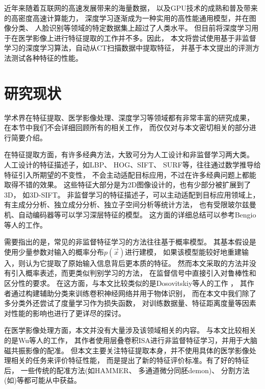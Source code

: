 近年来随着互联网的高速发展带来的海量数据，
以及GPU技术的成熟和普及带来的高密度高速计算能力，
深度学习逐渐成为一种实用的高性能通用模型，并在图像分类\cite{he2015delving}、
人脸识别\cite{schroff2015facenet}等领域的特定数据集上超过了人类水平。
但目前将深度学习用于在医学影像上进行特征提取的工作并不多。因此，
本文将尝试使用基于非监督学习的深度学习算法，自动从CT扫描数据中提取特征，
并基于本文提出的评测方法测试各种特征的性能。

\section{研究现状}
学术界在特征提取、医学影像处理、深度学习等领域都有非常丰富的研究成果，
在本节中我们不会详细回顾所有的相关工作，
而仅仅对与本文密切相关的部分进行简要介绍。

在特征提取方面，有许多经典方法，大致可分为人工设计和非监督学习两大类。
人工设计的特征描述子，如LBP\cite{ojala1994performance}、
HOG\cite{dalal2005histograms}、SIFT\cite{lowe1999object}、
SURF\cite{bay2006surf}等，往往通过数学推导给特征引入所期望的不变性，
不会主动适配目标应用，不过在许多经典问题上都能取得不错的效果。
这些特征大部分是为2D图像设计的，也有少部分被扩展到了3D，
如3D-SIFT\cite{scovanner20073}。
非监督学习的特征描述子，可以主动适配到目标应用领域上，
有主成分分析、独立成分分析、独立子空间分析等统计方法，
也有受限玻尔兹曼机、自动编码器等可以学习深层特征的模型。
这方面的详细总结可以参考Bengio等人的工作\cite{bengio2013representation}。

需要指出的是，常见的非监督特征学习的方法往往基于概率模型。
其基本假设是使用少量参数对输入的概率分布$p(\vec{x})$进行建模，
如果该模型能较好地重建输入，则认为它提取了原始输入信息背后更本质的特征。
然而本文采取的方法并没有引入概率表述，而更类似判别学习的方法，
在监督信号中直接引入对鲁棒性和区分性的要求。
在这方面，与本文比较类似的是Dosovitskiy等人的工作
\cite{dosovitskiy2014discriminative}，
其作者通过构建辅助分类来训练卷积神经网络并用于物体识别，
而在本文中我们除了多分类外还尝试了度量学习作为损失函数，
对训练数据量、特征距离度量等因素对性能的影响也进行了更详尽的探讨。

在医学影像处理方面，本文并没有大量涉及该领域相关的内容。
与本文比较相关的是Wu等人的工作\cite{wu2013unsupervised}，
其作者使用层叠卷积ISA进行非监督特征学习，并用于大脑磁共振影像的配准。
但本文主要关注特征提取本身，并不使用具体的医学影像处理相关的任务来评价特征性能，
而是提出了新的特征评价标准。有了好的特征后，
一些传统的配准方法(如HAMMER\cite{shen2002hammer}、
多通道微分同胚demon\cite{peyrat2010registration})、
分割方法(如\cite{ling2008hierarchical})等都可能从中获益。

